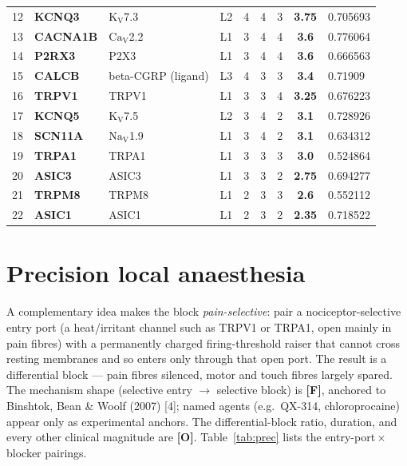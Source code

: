 \documentclass[11pt]{article}
\newcommand{\gF}{\textcolor{gf}{\textbf{[F]}}}
\newcommand{\gO}{\textcolor{go}{\textbf{[O]}}}
\newcommand{\NaVx}[2]{\ensuremath{\mathrm{#1_{V}}}#2}
\begin{document}
\begin{footnotesize}
\begin{longtable}{@{}cl>{\raggedright\arraybackslash}p{1.7cm}cS[table-format=1.1]S[table-format=1.1]S[table-format=1.1]S[table-format=1.2]l@{}}
12 & \textbf{KCNQ3} & \NaVx{K}{7.3} & L2 & 4 & 4 & 3 & \textbf{3.75} & \footnotesize 0.705693\\
13 & \textbf{CACNA1B} & \NaVx{Ca}{2.2} & L1 & 3 & 4 & 4 & \textbf{3.6} & \footnotesize 0.776064\\
14 & \textbf{P2RX3} & P2X3 & L1 & 3 & 4 & 4 & \textbf{3.6} & \footnotesize 0.666563\\
15 & \textbf{CALCB} & beta-CGRP (ligand) & L3 & 4 & 3 & 3 & \textbf{3.4} & \footnotesize 0.71909\\
16 & \textbf{TRPV1} & TRPV1 & L1 & 3 & 3 & 4 & \textbf{3.25} & \footnotesize 0.676223\\
17 & \textbf{KCNQ5} & \NaVx{K}{7.5} & L2 & 3 & 4 & 2 & \textbf{3.1} & \footnotesize 0.728926\\
18 & \textbf{SCN11A} & \NaVx{Na}{1.9} & L1 & 3 & 4 & 2 & \textbf{3.1} & \footnotesize 0.634312\\
19 & \textbf{TRPA1} & TRPA1 & L1 & 3 & 3 & 3 & \textbf{3.0} & \footnotesize 0.524864\\
20 & \textbf{ASIC3} & ASIC3 & L1 & 3 & 3 & 2 & \textbf{2.75} & \footnotesize 0.694277\\
21 & \textbf{TRPM8} & TRPM8 & L1 & 2 & 3 & 3 & \textbf{2.6} & \footnotesize 0.552112\\
22 & \textbf{ASIC1} & ASIC1 & L1 & 2 & 3 & 2 & \textbf{2.35} & \footnotesize 0.718522\\
\end{longtable}
\end{footnotesize}

\section{Precision local anaesthesia}
A complementary idea makes the block \emph{pain-selective}: pair a nociceptor-selective entry port (a heat/irritant channel such as TRPV1 or TRPA1, open mainly in pain fibres) with a permanently charged firing-threshold raiser that cannot cross resting membranes and so enters only through that open port. The result is a differential block --- pain fibres silenced, motor and touch fibres largely spared. The mechanism shape (selective entry $\rightarrow$ selective block) is \gF{}, anchored to Binshtok, Bean \& Woolf (2007) [4]; named agents (e.g.\ QX-314, chloroprocaine) appear only as experimental anchors. The differential-block ratio, duration, and every other clinical magnitude are \gO{}. Table~\ref{tab:prec} lists the entry-port\,$\times$\,blocker pairings.
\end{document}
